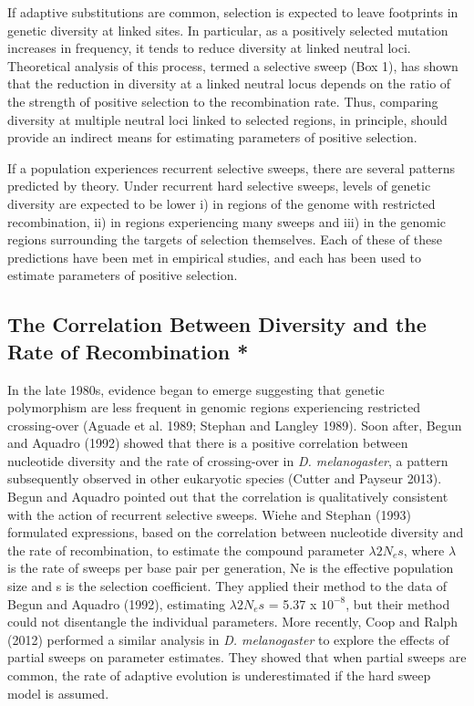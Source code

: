 If adaptive substitutions are common, selection is expected to leave footprints in genetic diversity at linked sites. In particular, as a positively selected mutation increases in frequency, it tends to reduce diversity at linked neutral loci. Theoretical analysis of this process, termed a selective sweep (Box 1), has shown that the reduction in diversity at a linked neutral locus depends on the ratio of the strength of positive selection to the recombination rate. Thus, comparing diversity at multiple neutral loci linked to selected regions, in principle, should provide an indirect means for estimating parameters of positive selection.
 

If a population experiences recurrent selective sweeps, there are several patterns predicted by theory. Under recurrent hard selective sweeps, levels of genetic diversity are expected to be lower i) in regions of the genome with restricted recombination, ii) in regions experiencing many sweeps and iii) in the genomic regions surrounding the targets of selection themselves. Each of these of these predictions have been met in empirical studies, and each has been used to estimate parameters of positive selection.


\subsection[Using models of selective sweeps to estimate positive selection parameters]{The Correlation Between Diversity and the Rate of Recombination *}

In the late 1980s, evidence began to emerge suggesting that genetic polymorphism are less frequent in genomic regions experiencing restricted crossing-over (Aguade et al. 1989; Stephan and Langley 1989). Soon after, Begun and Aquadro (1992) showed that there is a positive correlation between nucleotide diversity and the rate of crossing-over in \emph{D. melanogaster}, a pattern subsequently observed in other eukaryotic species (Cutter and Payseur 2013). Begun and Aquadro pointed out that the correlation is qualitatively consistent with the action of recurrent selective sweeps. Wiehe and Stephan (1993) formulated expressions, based on the correlation between nucleotide diversity and the rate of recombination, to estimate the compound parameter $\lambda 2N_{e}s$, where $\lambda$ is the rate of sweeps per base pair per generation, Ne is the effective population size and s is the selection coefficient. They applied their method to the data of Begun and Aquadro (1992), estimating $\lambda2N_{e}s$ = 5.37 x $10^{-8}$, but their method could not disentangle the individual parameters. More recently, Coop and Ralph (2012) performed a similar analysis in \emph{D. melanogaster} to explore the effects of partial sweeps on parameter estimates. They showed that when partial sweeps are common, the rate of adaptive evolution is underestimated if the hard sweep model is assumed.
 

